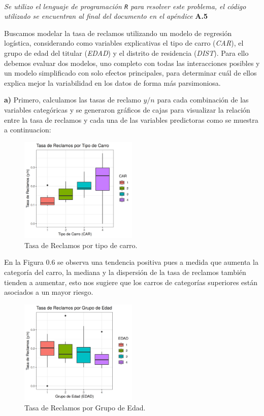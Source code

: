 \noindent{}\\

\textit{Se utilizo el lenguaje de programación \texttt{R} para resolver este problema, el código utilizado se encuentran al final del documento en el apéndice} \textbf{A.5}

Buscamos modelar la tasa de reclamos utilizando un modelo de regresión logística, considerando como variables explicativas el tipo de carro (\textit{CAR}), el grupo de edad del titular (\textit{EDAD}) y el distrito de residencia (\textit{DIST}). Para ello debemos evaluar dos modelos, uno completo con todas las interacciones posibles y un modelo simplificado con solo efectos principales, para determinar cuál de ellos explica mejor la variabilidad en los datos de forma más parsimoniosa.

\newpage
\textbf{a)} Primero, calculamos las tasas de reclamo $y/n$ para cada combinación de las variables categóricas y se generaron gráficos de cajas para visualizar la relación entre la tasa de reclamos y cada una de las variables predictoras como se muestra a continuacion:

\begin{figure}[H]
    \centering
    \includegraphics[width=0.5\textwidth]{images/rate_vs_car.png}
    \caption{Tasa de Reclamos por tipo de carro.}
    \label{fig:car_boxplot}
\end{figure}

En la Figura 0.6 se observa una tendencia positiva pues a medida que aumenta la categoría del carro, la mediana y la dispersión de la tasa de reclamos también tienden a aumentar, esto nos sugiere que los carros de categorías superiores están asociados a un mayor riesgo.

\begin{figure}[H]
    \centering
    \includegraphics[width=0.5\textwidth]{images/rate_vs_edad.png}
    \caption{Tasa de Reclamos por Grupo de Edad.} 
    \label{fig:edad_boxplot}
\end{figure}

